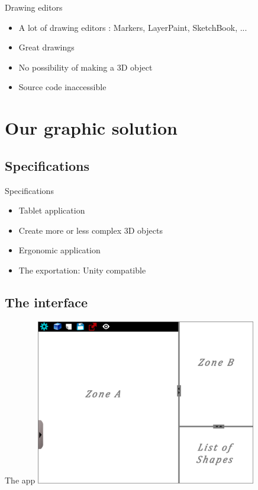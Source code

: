 \documentclass[a4paper,10pt]{beamer}
\begin{document}
			\begin{frame}{Drawing editors}
				\begin{itemize}
					\item A lot of drawing editors : Markers, LayerPaint, SketchBook, ...
					\item Great drawings
					\item No possibility of making a 3D object
					\item Source code inaccessible
				\end{itemize}
			\end{frame}
	
	\section{Our graphic solution}
		\subsection{Specifications}
		
		\begin{frame}{Specifications}
			\begin{itemize}
				\item Tablet application
				\item Create more or less complex 3D objects
				\item Ergonomic application
				\item The exportation: Unity compatible
			\end{itemize}
		\end{frame}
		
		\subsection{The interface}
		
			\begin{frame}{The app}
				\includegraphics[height=205pt]{maquette/maquette_1.png}
			\end{frame}
			
\end{document}
